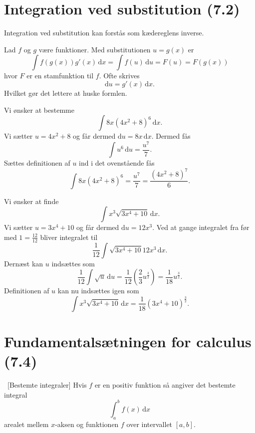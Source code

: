 
\section{Integration ved substitution (7.2)}
Integration ved substitution kan forstås som kædereglens inverse. 
\begin{definition} 
  Lad $f$ og $g$ være funktioner. Med substitutionen $u = g(x)$ er
  \[ 
  \int f(g(x))g'(x)\, \mathrm{d}x = \int f(u) \, \mathrm{d}u = F(u) = F(g(x))
  \]
  hvor $F$ er en stamfunktion til $f$. Ofte skrives
  \[ 
  \mathrm{d}u = g'(x) \, \mathrm{d}x 
  .\]
  Hvilket gør det lettere at huske formlen.
\end{definition}

\begin{eks} 
  Vi ønsker at bestemme
  \[ 
  \int 8x \left( 4x^2 + 8 \right)^{6} \, \mathrm{d}x
  .\]
  Vi sætter $u = 4x^2 + 8$ og får dermed $\mathrm{d}u = 8x \, \mathrm{d}x$. Dermed fås
  \[ 
  \int u^{6} \, \mathrm{d}u = \frac{u^{7}}{7}
  .\]
  Sættes definitionen af $u$ ind i det ovenstående fås
  \[ 
  \int 8x \left( 4x^2 + 8 \right)^{6} = \frac{u^{7}}{7} = \frac{\left( 4x^2 + 8 \right)^{7}}{6}
  .\]
\end{eks}

\begin{eks} 
  Vi ønsker at finde
  \[ 
  \int x^3 \sqrt{3x^{4} + 10} \, \mathrm{d}x 
  .\]
  Vi sætter $u = 3x^{4} + 10$ og får dermed $\mathrm{d}u = 12x^3$. Ved at gange integralet fra før med $1 = \frac{12}{12}$ bliver integralet til
  \[ 
  \frac{1}{12}\int \sqrt{3x^{4} + 10} 12x^3 \, \mathrm{d}x
  .\]
  Dernæst kan $u$ indsættes som
  \[ 
  \frac{1}{12} \int \sqrt{u} \, \mathrm{d}u = \frac{1}{12} \left( \frac{2}{3} u^{\frac{3}{2}} \right) = \frac{1}{18} u^{\frac{3}{2}}
  .\]
  Definitionen af $u$ kan nu indsættes igen som
  \[ 
  \int x^3 \sqrt{3x^{4} + 10} \, \mathrm{d}x = \frac{1}{18} \left( 3x^{4} + 10 \right)^{\frac{3}{2}}
  .\]
\end{eks}

\section{Fundamentalsætningen for calculus (7.4)}

\begin{definition} [Bestemte integraler]
  Hvis $f$ er en positiv funktion så angiver det bestemte integral 
  \[ 
  \int_{a}^{b} f(x) \, \mathrm{d}x 
  \]
  arealet mellem $x$-aksen og funktionen $f$ over intervallet $[a,b]$.
\end{definition}

